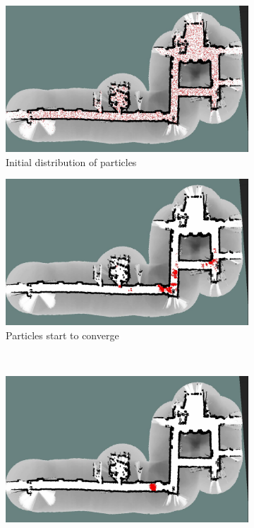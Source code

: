 \begin{figure}
\centering
\begin{subfigure}[b]{0.49\textwidth}
\includegraphics[width=\linewidth]{figures/Screenshot-video_log1-10k_good-1}
\caption{Initial distribution of particles}
\label{fig:Screenshot-video_log1-10k_good-1}
\end{subfigure}
\begin{subfigure}[b]{0.49\textwidth}
\includegraphics[width=\linewidth]{figures/Screenshot-video_log1-10k_good-2}
\caption{Particles start to converge}
\label{fig:Screenshot-video_log1-10k_good-2}
\end{subfigure}
\\
\begin{subfigure}[b]{0.49\textwidth}
\includegraphics[width=\linewidth]{figures/Screenshot-video_log1-10k_good-3}

\end{subfigure}
\end{figure}
